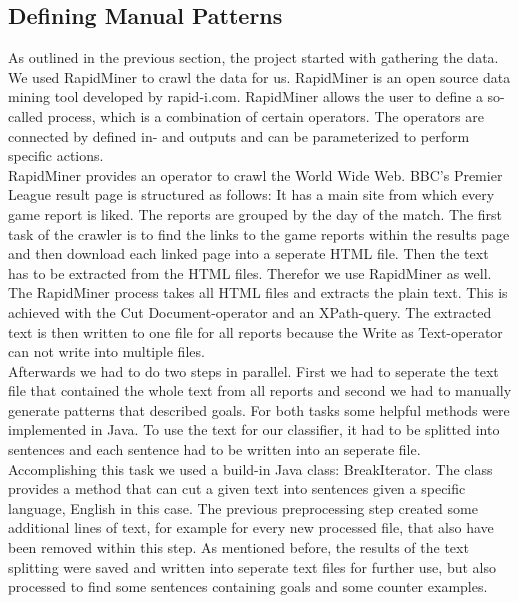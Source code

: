\documentclass[11pt,titlepage,oneside,openany]{book}
\begin{document}
\subsection{Defining Manual Patterns}
As outlined in the previous section, the project started with gathering the data. We used RapidMiner to crawl the data for us. RapidMiner is an open source data mining tool developed by rapid-i.com. RapidMiner allows the user to define a so-called process, which is a combination of certain operators. The operators are connected by defined in- and outputs and can be parameterized to perform specific actions. \\
RapidMiner provides an operator to crawl the World Wide Web. BBC's Premier League result page is structured as follows: It has a main site from which every game report is liked. The reports are grouped by the day of the match. The first task of the crawler is to find the links to the game reports within the results page and then download each linked page into a seperate HTML file. Then the text has to be extracted from the HTML files. Therefor we use RapidMiner as well. The RapidMiner process takes all HTML files and extracts the plain text. This is achieved with the Cut Document-operator and an XPath-query. The extracted text is then written to one file for all reports because the Write as Text-operator can not write into multiple files. \\ 

Afterwards we had to do two steps in parallel. First we had to seperate the text file that contained the whole text from all reports and second we had to manually generate patterns that described goals.
For both tasks some helpful methods were implemented in Java. To use the text for our classifier, it had to be splitted into sentences and each sentence had to be written into an seperate file. Accomplishing this task we used a build-in Java class: BreakIterator. The class provides a method that can cut a given text into sentences given a specific language, English in this case. The previous preprocessing step created some additional lines of text, for example for every new processed file, that also have been removed within this step. As mentioned before, the results of the text splitting were saved and written into seperate text files for further use, but also processed to find some sentences containing goals and some counter examples. \\
\end{document}

